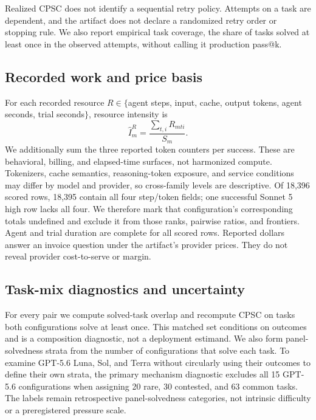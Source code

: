 \documentclass[11pt]{article}
\begin{document}
Realized CPSC does not identify a sequential retry policy. Attempts on a task are dependent, and
the artifact does not declare a randomized retry order or stopping rule. We also report empirical
task coverage, the share of tasks solved at least once in the observed attempts, without calling it
production pass@k.

\subsection{Recorded work and price basis}

For each recorded resource $R\in\{$agent steps, input, cache, output tokens, agent seconds, trial
seconds$\}$, resource intensity
is
\begin{equation}
\widehat I^R_m=\frac{\sum_{t,i}R_{mti}}{S_m}.
\end{equation}
We additionally sum the three reported token counters per success. These are behavioral, billing,
and elapsed-time surfaces, not harmonized compute. Tokenizers, cache semantics, reasoning-token
exposure, and service conditions may differ by model and provider, so cross-family levels are
descriptive. Of 18,396 scored rows, 18,395 contain all four step/token fields; one successful
Sonnet 5 high row lacks all four. We therefore mark that configuration's corresponding totals
undefined and exclude it from those ranks, pairwise ratios, and frontiers. Agent and trial duration
are complete for all scored rows. Reported dollars answer an invoice question under the artifact's
provider prices. They do not reveal provider cost-to-serve or margin.

\subsection{Task-mix diagnostics and uncertainty}

For every pair we compute solved-task overlap and recompute CPSC on tasks both configurations solve
at least once. This matched set conditions on outcomes and is a composition diagnostic, not a
deployment estimand. We also form panel-solvedness strata from the number of configurations that
solve each task. To examine GPT-5.6 Luna, Sol, and Terra without circularly using their outcomes to
define their own strata, the primary mechanism diagnostic excludes all 15 GPT-5.6 configurations
when assigning 20 rare, 30 contested, and 63 common tasks. The labels remain retrospective
panel-solvedness categories, not intrinsic difficulty or a preregistered pressure scale.
\end{document}
